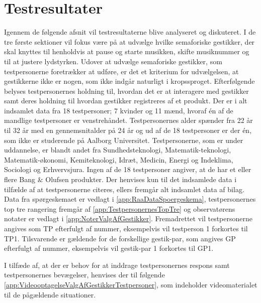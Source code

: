 \chapter{Testresultater}
\label{Testresultater}
%
Igennem de følgende afsnit vil testresultaterne blive analyseret og diskuteret. I de tre første sektioner vil fokus være på at udvælge hvilke semaforiske gestikker, der skal knyttes til henholdvis at pause og starte musikken, skifte musiknummer og til at justere lydstyrken. Udover at udvælge semaforiske gestikker, som testpersonerne foretrækker at udføre, er det et kriterium for udvælgelsen, at gestikkerne ikke er nogen, som ikke indgår naturligt i kropssproget. Efterfølgende belyses testpersonernes holdning til, hvordan det er at interagere med gestikker samt deres holdning til hvordan gestikker registreres af et produkt.\blankline
%
Der er i alt indsamlet data fra 18 testpersoner; 7 kvinder og 11 mænd, hvoraf én af de mandlige testpersoner er venstrehåndet. Testpersonernes alder spænder fra 22 år til 32 år med en gennemsnitalder på 24 år og ud af de 18 testpersoner er der én, som ikke er studerende på Aalborg Universitet. Testpersonerne, som er under uddannelse, er blandt andet fra Sundhedsteknologi, Matematik-teknologi, Matematik-økonomi, Kemiteknologi, Idræt, Medicin, Energi og Indeklima, Sociologi og Erhvervsjura. Ingen af de 18 testpersoner angiver, at de har et eller flere Bang $\&$ Olufsen produkter. Der henvises kun til det indsamlede data i tilfælde af at testpersonerne citeres, ellers fremgår alt indsamlet data af bilag. Data fra spørgeskemaet er vedlagt i \autoref{app:RaaDataSpoergeskema}, testpersonernes top tre rangering fremgår af \autoref{app:TestpersonernesTopTre} og observatørens notater er vedlagt i \autoref{app:NoterValgAfGestikker}. Fremadrettet vil testpersonerne angives som TP efterfulgt af nummer, eksempelvis vil testperson 1 forkortes til TP1. Tilsvarende er gældende for de forskellige gestik-par, som angives GP efterfulgt af nummer, eksempelvis vil gestik-par 1 forkortes til GP1.

I tilfæde af, at der er behov for at inddrage testpersonernes respons samt testpersonernes bevægelser, henvises der til følgende \autoref{app:VideooptagelseValgAfGestikkerTestpersoner}, som indeholder videomaterialet til de pågældende situationer.       